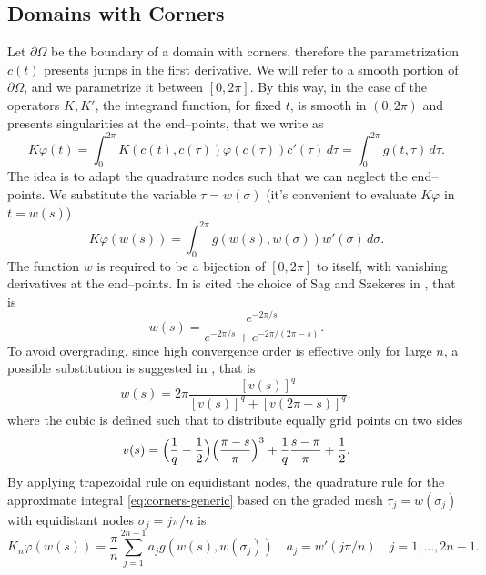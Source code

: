 \documentclass[10pt, a4paper, twoside, openright]{book}
\theoremstyle{definition}
\theoremstyle{plain}
\theoremstyle{plain}
\theoremstyle{plain}
\theoremstyle{plain}
\theoremstyle{plain}
\theoremstyle{plain}
\theoremstyle{plain}
\theoremstyle{plain}
\let\phi\varphi
\begin{document}
\subsection{Domains with Corners}
Let $\partial \Omega$ be the boundary of a domain with corners, therefore the parametrization $c(t)$ presents jumps in the first derivative.
We will refer to a smooth portion of $\partial \Omega$, and we parametrize it between $[0,2\pi]$. 
By this way, in the case of the operators $K,K'$, the integrand function, for fixed $t$, is smooth in $(0,2\pi)$ and presents 
singularities at the end--points, that we write as
\begin{equation}
\label{eq:corners-double}
 K\phi(t)=\int_0^{2\pi}K(c(t),c(\tau))\phi(c(\tau))c'(\tau)\,d\tau=\int_0^{2\pi}g(t,\tau)\,d\tau.
\end{equation}
The idea is to adapt the quadrature nodes such that we can neglect the end--points.
We substitute the variable $\tau=w(\sigma)$ (it's convenient to evaluate $K\phi$ in $t=w(s)$)
\begin{equation}
\label{eq:corners-generic}
 K\phi(w(s))=\int_0^{2\pi}g(w(s),w(\sigma))w'(\sigma)\,d\sigma.
\end{equation}
The function $w$ is required to be a bijection of $[0,2\pi]$ to itself, with vanishing derivatives at the end--points. In \cite{kress:bie-scattering} is cited the choice of Sag and Szekeres in \cite{Sa-Sz64}, that is
\begin{equation}
 w(s)=\frac{e^{-2\pi/s}}{e^{-2\pi/s} + e^{-2\pi/(2\pi - s)}}.
\end{equation}
To avoid overgrading, since high convergence order is effective only for large $n$, a possible substitution is suggested in \cite{kress:bie-corners}, that is
\begin{equation}
 w(s)=2\pi\frac{[v(s)]^q}{[v(s)]^q + [v(2\pi - s)]^q},\label{eq:graded-parametrization-power}
\end{equation}
where the cubic is defined such that to distribute equally grid points on two sides
\begin{equation}
 v(s)=\Bigl(\frac{1}{q} - \frac{1}{2}\Bigr)\Bigl(\frac{\pi - s}{\pi}\Bigr)^3 + \frac{1}{q}\frac{s-\pi}{\pi} + \frac{1}{2}.
\end{equation}
By applying trapezoidal rule on equidistant nodes, the quadrature rule for the approximate integral \eqref{eq:corners-generic} based on the graded mesh $\tau_j=w(\sigma_j)$ 
with equidistant nodes $\sigma_j=j\pi/n$ is 
\begin{equation}
 K_n\phi(w(s))=\frac{\pi}{n}\sum_{j=1}^{2n-1}a_jg(w(s), w(\sigma_j))\quad a_j=w'(j\pi/n)\quad j=1,\dots,2n-1.
\end{equation}
\end{document}
